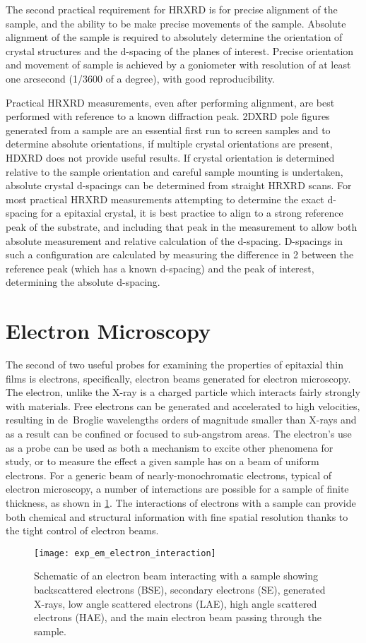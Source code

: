 The second practical requirement for HRXRD is for precise alignment of the sample, and the ability to be make precise movements of the sample.
Absolute alignment of the sample is required to absolutely determine the orientation of crystal structures and the d-spacing of the planes of interest.
Precise orientation and movement of sample is achieved by a goniometer with resolution of at least one arcsecond (1/3600 of a degree), with good reproducibility.

Practical HRXRD measurements, even after performing alignment, are best performed with reference to a known diffraction peak.
2DXRD pole figures generated from a sample are an essential first run to screen samples and to determine absolute orientations, if multiple crystal orientations are present, HDXRD does not provide useful results.
If crystal orientation is determined relative to the sample orientation and careful sample mounting is undertaken, absolute crystal d-spacings can be determined from straight HRXRD scans.
For most practical HRXRD measurements attempting to determine the exact d-spacing for a epitaxial crystal, it is best practice to align to a strong reference peak of the substrate, and including that peak in the measurement to allow both absolute measurement and relative calculation of the d-spacing.
D-spacings in such a configuration are calculated by measuring the difference in 2\straighttheta{} between the reference peak (which has a known d-spacing) and the peak of interest, determining the absolute d-spacing.

\section{Electron Microscopy}
The second of two useful probes for examining the properties of epitaxial thin films is electrons, specifically, electron beams generated for electron microscopy.
The electron, unlike the X-ray is a charged particle which interacts fairly strongly with materials.
Free electrons can be generated and accelerated to high velocities, resulting in de~Broglie wavelengths orders of magnitude smaller than X-rays and as a result can be confined or focused to sub-angstrom areas.
The electron's use as a probe can be used as both a mechanism to excite other phenomena for study, or to measure the effect a given sample has on a beam of uniform electrons.
For a generic beam of nearly-monochromatic electrons, typical of electron microscopy, a number of interactions are possible for a sample of finite thickness, as shown in \cref{fig:exp_em_electron_interaction}.
The interactions of electrons with a sample can provide both chemical and structural information with fine spatial resolution thanks to the tight control of electron beams.
\begin{figure}
 \centering \texttt{[image: exp\_em\_electron\_interaction]}
 \caption[Electron interactions with materials]{\label{fig:exp_em_electron_interaction}Schematic of an electron beam interacting with a sample showing backscattered electrons (BSE), secondary electrons (SE), generated X-rays, low angle scattered electrons (LAE), high angle scattered electrons (HAE), and the main electron beam passing through the sample.}
\end{figure}

